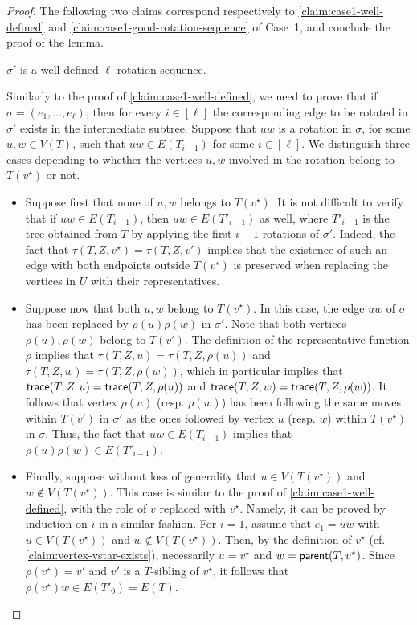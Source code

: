 \documentclass[a4paper,UKenglish,cleveref, autoref, thm-restate]{lipics-v2021}
\newenvironment{cproof}{\proof[Proof of claim]\renewcommand\qedsymbol{$\diamond$}}{\endproof}
\newcommand{\parent}{{\sf parent}\xspace}
\newcommand{\trace}{{\sf trace}\xspace}
\begin{document}
\begin{proof}
The following two claims correspond respectively to \autoref{claim:case1-well-defined} and \autoref{claim:case1-good-rotation-sequence} of Case~1, and conclude the proof of the lemma.

\begin{claim}\label{claim:case2-well-defined}
$\sigma'$ is a well-defined $\ell$-rotation sequence.
\end{claim}
\begin{cproof} Similarly to the proof of \autoref{claim:case1-well-defined}, we need to prove that if
$\sigma=(e_1,\ldots,e_{\ell})$, then for every $i \in [\ell]$ the corresponding edge to be rotated  in $\sigma'$ exists in the intermediate subtree.  Suppose that $uw$ is a rotation in $\sigma$, for some $u,w \in V(T)$, such that $uw \in E(T_{i-1})$ for some $i \in [\ell]$. We distinguish three cases depending to whether the vertices $u,w$ involved in the rotation belong to $T(v^{\star})$ or not.

\begin{itemize}
  \item Suppose first that none of $u,w$ belongs to $T(v^{\star})$. It is not difficult to verify that if $uw \in E(T_{i-1})$, then $uw \in E(T'_{i-1})$ as well, where $T'_{i-1}$ is the tree obtained from $T$ by applying the first $i-1$ rotations of $\sigma'$. Indeed, the fact that $\tau(T,Z,v^{\star})=\tau(T,Z,v')$ implies that the existence of such an edge with both endpoints outside $T(v^{\star})$ is preserved when replacing the vertices in $U$ with their representatives.

  \item Suppose now that both $u,w$ belong to $T(v^{\star})$. In this case, the edge $uw$ of $\sigma$ has been replaced by $\rho(u) \rho(w)$ in $\sigma'$. Note that both vertices $\rho(u), \rho(w)$ belong to $T(v')$. The definition of the representative function $\rho$ implies that $\tau(T,Z,u)=\tau(T,Z,\rho(u))$ and $\tau(T,Z,w)=\tau(T,Z,\rho(w))$, which in particular implies that $\trace(T,Z,u)=\trace(T,Z,\rho(u))$ and $\trace(T,Z,w)=\trace(T,Z,\rho(w))$. It follows that
       vertex $\rho(u)$ (resp. $\rho(w)$) has been following the same moves within $T(v')$ in $\sigma'$ as the ones followed by vertex $u$ (resp. $w$) within $T(v^{\star})$ in $\sigma$.
       Thus, the fact that $uw \in E(T_{i-1})$ implies that $\rho(u) \rho(w) \in E(T'_{i-1})$.

  \item Finally, suppose without loss of generality that $u \in V(T(v^{\star}))$ and $w \notin V(T(v^{\star}))$. This case is similar to the proof of \autoref{claim:case1-well-defined}, with the role of $v$ replaced with $v^{\star}$. Namely, it can be proved by induction on $i$ in a similar fashion. For $i=1$, assume that $e_1=uw$ with $u \in V(T(v^{\star}))$ and $w \notin V(T(v^{\star}))$. Then, by the definition of $v^{\star}$ (cf. \autoref{claim:vertex-vstar-exists}), necessarily $u = v^{\star}$ and $w = \parent(T,v^{\star})$. Since $\rho(v^{\star}) = v'$ and  $v'$ is a $T$-sibling of $v^{\star}$, it follows that $\rho(v^{\star})w \in E(T'_{0})=E(T)$.


\end{itemize}
\end{cproof}
\end{proof}
\end{document}

